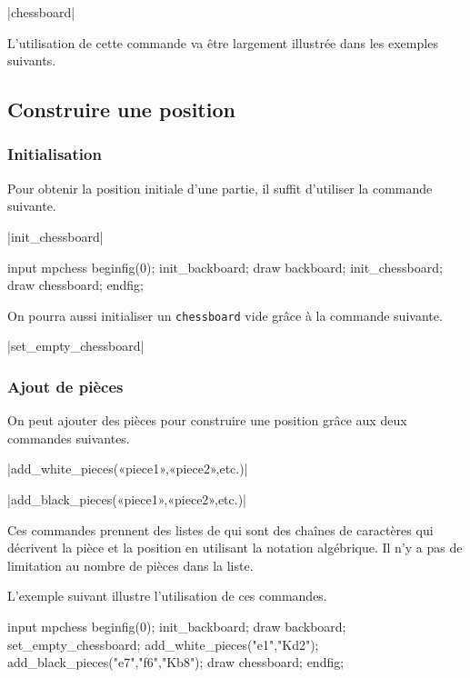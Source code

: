\documentclass[french]{ltxdoc}
\begin{document}
\commande|chessboard|\smallskip \label{com:chessboard}

L’utilisation de cette commande va être largement illustrée dans les exemples suivants.

\subsection{Construire une position}

\subsubsection{Initialisation}

Pour obtenir la position initiale d’une partie, il suffit d’utiliser la commande suivante.

\commande|init_chessboard|\smallskip

\begin{ExempleMP}
input mpchess
beginfig(0);
init_backboard;
draw backboard;
init_chessboard;
draw chessboard;
endfig;
\end{ExempleMP}

On pourra aussi initialiser un \lstinline+chessboard+ vide grâce à la commande suivante.

\commande|set_empty_chessboard|\smallskip

\subsubsection{Ajout de pièces}

On peut ajouter des pièces pour construire une position grâce aux deux commandes suivantes.

\commande|add_white_pieces(«piece1»,«piece2»,etc.)|\smallskip


\commande|add_black_pieces(«piece1»,«piece2»,etc.)|\smallskip

Ces commandes prennent des listes de \textbf{} qui sont des chaînes
de caractères qui décrivent la pièce et la position en utilisant la notation
algébrique. Il n’y a pas de limitation au nombre de pièces dans la liste.

L’exemple suivant illustre l’utilisation de ces commandes.
\begin{ExempleMP}
input mpchess
beginfig(0);
init_backboard;
draw backboard;
set_empty_chessboard;
add_white_pieces("e1","Kd2");
add_black_pieces("e7","f6","Kb8");
draw chessboard;
endfig;
\end{ExempleMP}
\end{document}
